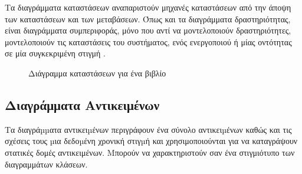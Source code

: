 \documentclass{assignment}
\begin{document}
Τα διαγράμματα καταστάσεων αναπαριστούν μηχανές καταστάσεων από την άποψη των καταστάσεων και των μεταβάσεων. Όπως και τα διαγράμματα δραστηριότητας, είναι διαγράμματα συμπεριφοράς, μόνο που αντί να μοντελοποιούν δραστηριότητες, μοντελοποιούν τις καταστάσεις του συστήματος, ενός ενεργοποιού ή μίας οντότητας σε μία συγκεκριμένη στιγμή \cite{virvou_uml,wazlawick2014object}.










\begin{figure}
\begin{center}
\caption{Διάγραμμα καταστάσεων για ένα βιβλίο} 
\label{fig:statechart_diagram_book}
\end{center}
\end{figure}







\subsection{Διαγράμματα Αντικειμένων}

Τα διαγράµµατα αντικειµένων περιγράφουν ένα σύνολο αντικειµένων καθώς και τις σχέσεις τους µια δεδοµένη χρονική στιγµή και χρησιμοποιούνται για να καταγράψουν στατικές δομές αντικειμένων. Μπορούν να χαρακτηριστούν σαν ένα στιγμιότυπο των διαγραμμάτων κλάσεων. 
\end{document}

